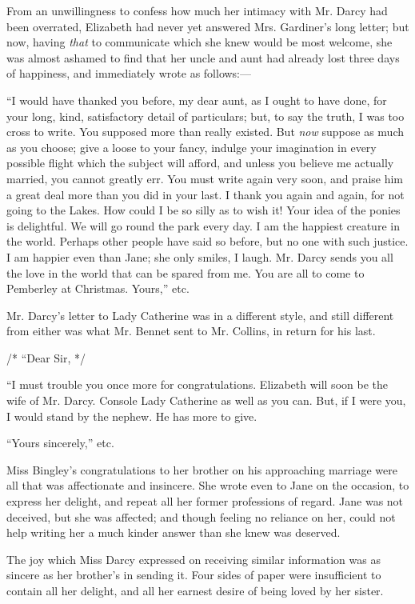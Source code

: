 \documentclass[12pt]{book}
\begin{document}
From an unwillingness to confess how much her intimacy with Mr. Darcy had been overrated, Elizabeth had never yet answered Mrs. Gardiner's long letter; but now, having \textit{that} to communicate which she knew would be most welcome, she was almost ashamed to find that her uncle and aunt had already lost three days of happiness, and immediately wrote as follows:---

``I would have thanked you before, my dear aunt, as I ought to have done, for your long, kind, satisfactory detail of particulars; but, to say the truth, I was too cross to write. You supposed more than really existed. But \textit{now} suppose as much as you choose; give a loose to your fancy, indulge your imagination in every possible flight which the subject will afford, and unless you believe me actually married, you cannot greatly err. You must write again very soon, and praise him a great deal more than you did in your last. I thank you again and again, for not going to the Lakes. How could I be so silly as to wish it! Your idea of the ponies is delightful. We will go round the park every day. I am the happiest creature in the world. Perhaps other people have said so before, but no one with such justice. I am happier even than Jane; she only smiles, I laugh. Mr. Darcy sends you all the love in the world that can be spared from me. You are all to come to Pemberley at Christmas. Yours,'' etc.

Mr. Darcy's letter to Lady Catherine was in a different style, and still different from either was what Mr. Bennet sent to Mr. Collins, in return for his last.

/* ``Dear Sir, */

``I must trouble you once more for congratulations. Elizabeth will soon be the wife of Mr. Darcy. Console Lady Catherine as well as you can. But, if I were you, I would stand by the nephew. He has more to give.

``Yours sincerely,'' etc.

Miss Bingley's congratulations to her brother on his approaching marriage were all that was affectionate and insincere. She wrote even to Jane on the occasion, to express her delight, and repeat all her former professions of regard. Jane was not deceived, but she was affected; and though feeling no reliance on her, could not help writing her a much kinder answer than she knew was deserved.

The joy which Miss Darcy expressed on receiving similar information was as sincere as her brother's in sending it. Four sides of paper were insufficient to contain all her delight, and all her earnest desire of being loved by her sister.
\end{document}
